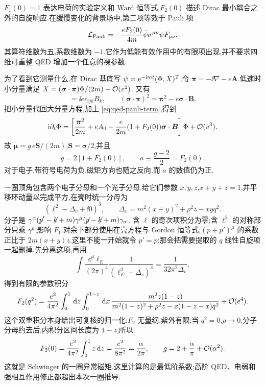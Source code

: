 $F_1(0)=1$ 表达电荷的实验定义和 Ward 恒等式,$F_2(0)$ 描述 Dirac 最小耦合之外的自旋响应.在缓慢变化的背景场中,第二项等效于 Pauli 项
\begin{equation}
 \Lag_{\rm Pauli}=-\frac{eF_2(0)}{4m}
       \bar\psi\sigma^{\mu\nu}\psi F_{\mu\nu}.
 \label{eq:qed-pauli-term}
\end{equation}
其算符维数为五,系数维数为 $-1$.它作为低能有效作用中的有限项出现,并不要求四维可重整 QED 增加一个任意的裸参数.

为了看到它测量什么,在 Dirac 基底写
$\psi=\e^{-\ii mt}(\Phi,X)^T$,令 $\boldsymbol\pi=-\ii\nabla-e\boldsymbol A$.低速时小分量满足
$X=(\boldsymbol\sigma\cdot\boldsymbol\pi)\Phi/(2m)+\order(v^2)$.
又有
\begin{equation}
 [\pi_i,\pi_j]=\ii e\epsilon_{ijk}B_k,\qquad
 (\boldsymbol\sigma\cdot\boldsymbol\pi)^2
       =\boldsymbol\pi^2-e\boldsymbol\sigma\cdot\boldsymbol B.
\end{equation}
把小分量代回大分量方程,加上 \eqref{eq:qed-pauli-term},得到
\begin{equation}
 \ii\partial_t\Phi=
 \left[\frac{\boldsymbol\pi^2}{2m}+eA_0
 -\frac{e}{2m}(1+F_2(0))\boldsymbol\sigma\cdot\boldsymbol B\right]\Phi
 +\order(v^3).
 \label{eq:qed-pauli-hamiltonian}
\end{equation}
故 $\boldsymbol\mu=g\,e\boldsymbol S/(2m)$,$\boldsymbol S=\boldsymbol\sigma/2$,并且
\begin{equation}
 g=2[1+F_2(0)],\qquad a\equiv\frac{g-2}{2}=F_2(0).
\end{equation}
对于电子,带符号电荷为负,磁矩方向也随之反向,而 $a$ 的数值仍为正.

一圈顶角包含两个电子分母和一个光子分母.给它们参数 $x,y,z$,$x+y+z=1$,并平移环动量以完成平方,在壳时统一分母为
\begin{equation}
 (\ell^2-\Delta_v+\ii0)^3,\qquad
 \Delta_v=m^2(x+y)^2+\rho^2z-xyq^2.
\end{equation}
分子是 $\gamma^\alpha(\slashed p'-\slashed k+m)
\gamma^\mu(\slashed p-\slashed k+m)\gamma_\alpha$.
含 $\ell$ 的奇次项积分为零;含 $\ell^2$ 的对称部分只乘 $\gamma^\mu$,影响 $F_1$.对余下部分使用在壳方程与 Gordon 恒等式,$(p+p')^\mu$ 的系数正比于 $2m(x+y)z$.这里不能一开始就令 $p'=p$:那会把需要提取的 $q$ 线性自旋项一起删掉.先分离这项,再用
\begin{equation}
 \int\frac{\dd^4\ell_E}{(2\pi)^4}
       \frac1{(\ell_E^2+\Delta_v)^3}=\frac1{32\pi^2\Delta_v},
\end{equation}
得到有限的参数积分
\begin{equation}
 F_2(q^2)=\frac{e^2}{4\pi^2}
 \int_0^1\dd z\int_0^{1-z}\dd x\,
 \frac{m^2z(1-z)}{m^2(1-z)^2+\rho^2z-x(1-z-x)q^2}
 +\order(e^4).
 \label{eq:qed-schwinger-parameter}
\end{equation}
这个双重积分本身给出可复核的归一化:$F_2$ 无量纲,紫外有限;当 $q^2=0$,$\rho\to0$,分子分母约去后,内积分区间长度为 $1-z$,所以
\begin{equation}
 F_2(0)=\frac{e^2}{4\pi^2}\int_0^1z\dd z
       =\frac{e^2}{8\pi^2}=\frac\alpha{2\pi},\qquad
 g=2+\frac\alpha\pi+\order(\alpha^2).
 \label{eq:qed-schwinger-result}
\end{equation}
这就是 Schwinger 的一圈异常磁矩.这里计算的是最低阶系数;高阶 QED、电弱和强相互作用修正都超出本次一圈推导.

